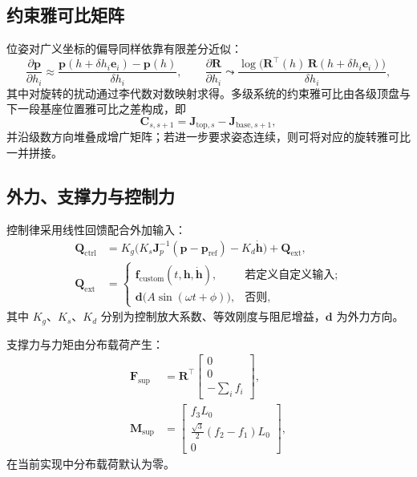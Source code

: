 \documentclass[12pt,a4paper]{article}
\begin{document}
\subsection{约束雅可比矩阵}
位姿对广义坐标的偏导同样依靠有限差分近似：
\begin{equation}
  \frac{\partial \bm p}{\partial h_i} \approx \frac{\bm p(h + \delta h_i \bm e_i) - \bm p(h)}{\delta h_i},\qquad
  \frac{\partial \bm R}{\partial h_i} \leadsto \frac{\log\big(\bm R^\top(h)\,\bm R(h + \delta h_i \bm e_i)\big)}{\delta h_i},
\end{equation}
其中对旋转的扰动通过李代数对数映射求得。多级系统的约束雅可比由各级顶盘与下一段基座位置雅可比之差构成，即
\begin{equation}
  \bm C_{s,s+1} = \bm J_{\text{top},s} - \bm J_{\text{base},s+1},
\end{equation}
并沿级数方向堆叠成增广矩阵；若进一步要求姿态连续，则可将对应的旋转雅可比一并拼接。

\subsection{外力、支撑力与控制力}\label{sec:control_force}
控制律采用线性回馈配合外加输入：
\begin{align}
  \bm Q_{\text{ctrl}} &= K_g \Big( K_s \bm J_p^{-1}(\bm p - \bm p_{\text{ref}}) - K_d \dot{\bm h} \Big) + \bm Q_{\text{ext}},\\
  \bm Q_{\text{ext}} &=
  \begin{cases}
    \bm f_{\text{custom}}(t, \bm h, \dot{\bm h}), & \text{若定义自定义输入};\\
    \bm d \big( A \sin(\omega t + \phi) \big), & \text{否则},
  \end{cases}
\end{align}
其中 $K_g$、$K_s$、$K_d$ 分别为控制放大系数、等效刚度与阻尼增益，$\bm d$ 为外力方向。

支撑力与力矩由分布载荷产生：
\begin{align}
  \bm F_{\text{sup}} &= \bm R^\top \begin{bmatrix}0\\0\\ -\sum_i f_i \end{bmatrix},\\
  \bm M_{\text{sup}} &= \begin{bmatrix}
    f_3 L_0 \\
    \frac{\sqrt{3}}{2}(f_2 - f_1) L_0 \\
    0
  \end{bmatrix},
\end{align}
在当前实现中分布载荷默认为零。
\end{document}
